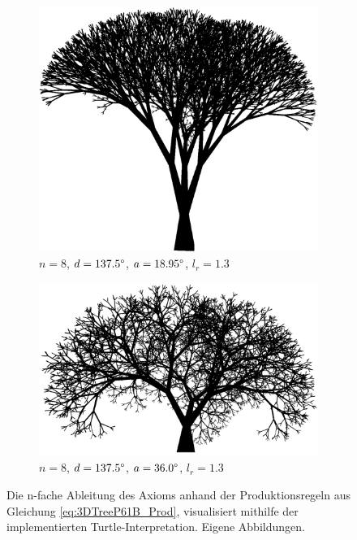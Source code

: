	\cite[S.60]{ABOP:04} 
\begin{figure} [hbtp]
	\centering
	\begin{subfigure}[t]{.7\textwidth}
		\centering
		\includegraphics[width=\linewidth]{images/3DTreeP61B_Angle_18_95.png}
		\caption{$n=8$, $d=137.5\degree$, $a=18.95\degree$, $l_r=1.3$}
		\label{subfig:3DTreeP61B_Angle_18_95}
	\end{subfigure}
	\begin{subfigure}[t]{.7\textwidth}
		\centering
		\includegraphics[width=\linewidth]{images/3DTreeP61B_Angle_36.png}
		\caption{$n=8$, $d=137.5\degree$, $a=36.0\degree$, $l_r=1.3$}
		\label{subfig:3DTreeP61B_Angle_36}
	\end{subfigure}
	\caption{Die n-fache Ableitung des Axioms anhand der Produktionsregeln aus Gleichung \ref{eq:3DTreeP61B_Prod}, visualisiert mithilfe der implementierten Turtle-Interpretation. Eigene Abbildungen.}
	\label{fig:BranchingLSystems3D}
\end{figure}

